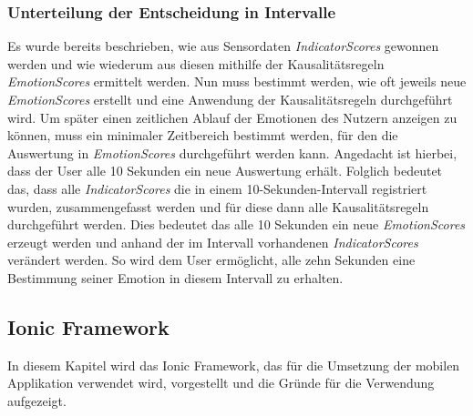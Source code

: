 \subsubsection{Unterteilung der Entscheidung in Intervalle}
Es wurde bereits beschrieben, wie aus Sensordaten \textit{IndicatorScores} gewonnen werden und wie wiederum aus diesen mithilfe der Kausalitätsregeln \textit{EmotionScores} ermittelt werden. Nun muss bestimmt werden, wie oft jeweils neue \textit{EmotionScores} erstellt und eine Anwendung der Kausalitätsregeln durchgeführt wird. \newline
Um später einen zeitlichen Ablauf der Emotionen des Nutzern anzeigen zu können, muss ein minimaler Zeitbereich bestimmt werden, für den die Auswertung in \textit{EmotionScores} durchgeführt werden kann. Angedacht ist hierbei, dass der User alle 10 Sekunden ein neue Auswertung erhält. Folglich bedeutet das, dass alle \textit{IndicatorScores} die in einem 10-Sekunden-Intervall registriert wurden, zusammengefasst werden und für diese dann alle Kausalitätsregeln durchgeführt werden. Dies bedeutet das alle 10 Sekunden ein neue \textit{EmotionScores} erzeugt werden und anhand der im Intervall vorhandenen \textit{IndicatorScores} verändert werden. So wird dem User ermöglicht, alle zehn Sekunden eine Bestimmung seiner Emotion in diesem Intervall zu erhalten.
\subsection{Ionic Framework}
In diesem Kapitel wird das Ionic Framework, das für die Umsetzung der mobilen Applikation verwendet wird, vorgestellt und die Gründe für die Verwendung aufgezeigt.
